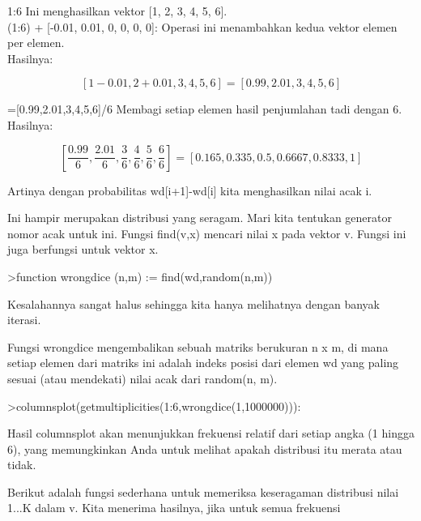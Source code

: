 \documentclass[a4paper,10pt]{article}
\begin{document}
\begin{eulernotebook}
\begin{eulercomment}
\begin{eulercomment}
\begin{eulercomment}
1:6 Ini menghasilkan vektor [1, 2, 3, 4, 5, 6].\\
(1:6) + [-0.01, 0.01, 0, 0, 0, 0]: Operasi ini menambahkan kedua
vektor elemen per elemen.\\
Hasilnya: \\
\end{eulercomment}
\begin{eulerformula}
\[
[1-0.01, 2+0.01, 3, 4, 5, 6] = [0.99, 2.01, 3, 4, 5, 6]
\]
\end{eulerformula}
\begin{eulercomment}
[1-0.01,2+0.01,3,4,5,6]=[0.99,2.01,3,4,5,6]/6 Membagi setiap elemen
hasil penjumlahan tadi dengan 6.\\
Hasilnya:\\
\end{eulercomment}
\begin{eulerformula}
\[
[\frac {0.99}{6}, \frac {2.01}{6}, \frac {3}{6}, \frac {4}{6}, \frac {5}{6}, \frac {6}{6}] = [0.165, 0.335, 0.5,0.6667, 0.8333, 1]
\]
\end{eulerformula}
\begin{eulercomment}
Artinya dengan probabilitas wd[i+1]-wd[i] kita menghasilkan nilai acak
i.

Ini hampir merupakan distribusi yang seragam. Mari kita tentukan
generator nomor acak untuk ini. Fungsi find(v,x) mencari nilai x pada
vektor v. Fungsi ini juga berfungsi untuk vektor x.
\end{eulercomment}
\begin{eulerprompt}
>function wrongdice (n,m) := find(wd,random(n,m))
\end{eulerprompt}
\begin{eulercomment}
Kesalahannya sangat halus sehingga kita hanya melihatnya dengan banyak
iterasi.

Fungsi wrongdice mengembalikan sebuah matriks berukuran n x m, di mana
setiap elemen dari matriks ini adalah indeks posisi dari elemen wd
yang paling sesuai (atau mendekati) nilai acak dari random(n, m).
\end{eulercomment}
\begin{eulerprompt}
>columnsplot(getmultiplicities(1:6,wrongdice(1,1000000))):
\end{eulerprompt}
\begin{eulercomment}
Hasil columnsplot akan menunjukkan frekuensi relatif dari setiap angka
(1 hingga 6), yang memungkinkan Anda untuk melihat apakah distribusi
itu merata atau tidak.

Berikut adalah fungsi sederhana untuk memeriksa keseragaman distribusi
nilai 1...K dalam v. Kita menerima hasilnya, jika untuk semua
frekuensi


\end{eulercomment}
\end{eulercomment}
\end{eulercomment}
\end{eulernotebook}
\end{document}
